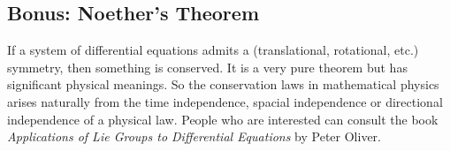 \subsection{Bonus: Noether's Theorem}
If a system of differential equations admits a (translational, rotational, etc.) symmetry, then something is conserved.
It is a very pure theorem but has significant physical meanings.
So the conservation laws in mathematical physics arises naturally from the time independence, spacial independence or directional independence of a physical law.
People who are interested can consult the book \textit{Applications of Lie Groups to Differential Equations} by Peter Oliver.